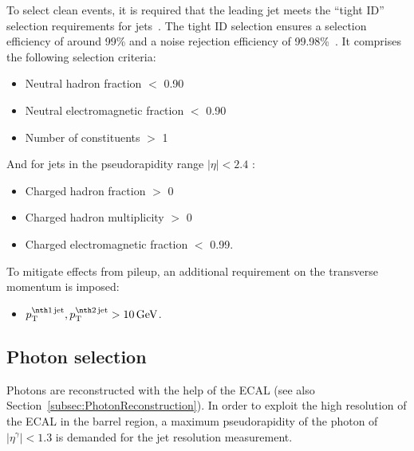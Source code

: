 To select clean \GAMJET events, it is required that the leading jet meets the ``tight ID'' selection requirements for jets~\cite{bib:JetIDRecommendation_7TeV,bib:AN:JetId_8TeV}.
The tight ID selection ensures a selection efficiency of around 99\% and a noise rejection efficiency of 99.98\%~\cite{bib:JetIDRecommendation_7TeV}.
It comprises the following selection criteria:
\begin{itemize}
 \item Neutral hadron fraction $<$ 0.90
 \item Neutral electromagnetic fraction $<$ 0.90
 \item Number of constituents $>$ 1
\end{itemize}
\newpage
 And for jets in the pseudorapidity range $|\eta| < 2.4 $ :
\begin{itemize}
 \item Charged hadron fraction $>$ 0
 \item Charged hadron multiplicity $>$ 0
 \item Charged electromagnetic fraction $<$ 0.99.
\end{itemize}

To mitigate effects from pileup, an additional requirement on the  transverse momentum is imposed:
\begin{itemize}
\item $\ptfirstjet,\ptsecondjet>10\gev$.
\end{itemize}

\subsection*{Photon selection}
Photons are reconstructed with the help of the ECAL (see also Section~\ref{subsec:PhotonReconstruction}).
In order to exploit the high resolution of the ECAL in the barrel region, a maximum pseudorapidity of the photon of $|\eta^{\gamma}| < 1.3$ is demanded for the jet \pt resolution measurement.


